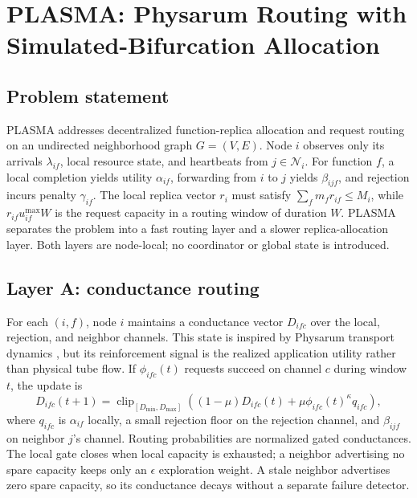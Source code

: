 
\section{PLASMA: Physarum Routing with Simulated-Bifurcation Allocation}
\label{sec:plasma}

\subsection{Problem statement}
PLASMA addresses decentralized function-replica allocation and request
routing on an undirected neighborhood graph $G=(V,E)$.  Node $i$ observes
only its arrivals $\lambda_{if}$, local resource state, and heartbeats from
$j\in\mathcal{N}_i$.  For function $f$, a local completion yields utility
$\alpha_{if}$, forwarding from $i$ to $j$ yields $\beta_{ijf}$, and rejection
incurs penalty $\gamma_{if}$.  The local replica vector $r_i$ must satisfy
$\sum_f m_f r_{if}\leq M_i$, while $r_{if}u_{if}^{\max}W$ is the request
capacity in a routing window of duration $W$.  PLASMA separates the problem
into a fast routing layer and a slower replica-allocation layer.  Both layers
are node-local; no coordinator or global state is introduced.

\subsection{Layer A: conductance routing}
For each $(i,f)$, node $i$ maintains a conductance vector $D_{ifc}$ over the
local, rejection, and neighbor channels.  This state is inspired by Physarum
transport dynamics \citep{bonifaci2012physarum}, but its reinforcement signal
is the realized application utility rather than physical tube flow.  If
$\phi_{ifc}(t)$ requests succeed on channel $c$ during window $t$, the update
is
\begin{equation}
 D_{ifc}(t+1)=\operatorname{clip}_{[D_{\min},D_{\max}]}
 \left((1-\mu)D_{ifc}(t)+\mu\phi_{ifc}(t)^{\kappa}q_{ifc}\right),
 \label{eq:plasma-conductance}
\end{equation}
where $q_{ifc}$ is $\alpha_{if}$ locally, a small rejection floor on the
rejection channel, and $\beta_{ijf}$ on neighbor $j$'s channel.  Routing
probabilities are normalized gated conductances.  The local gate closes when
local capacity is exhausted; a neighbor advertising no spare capacity keeps
only an $\epsilon$ exploration weight.  A stale neighbor advertises zero
spare capacity, so its conductance decays without a separate failure detector.

